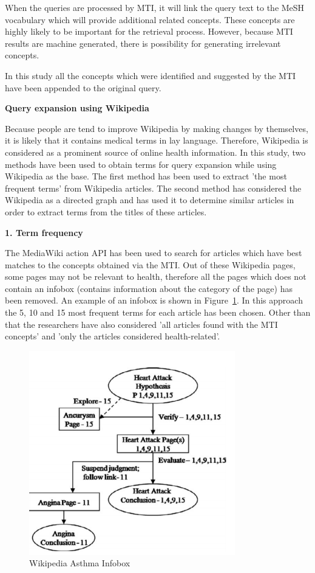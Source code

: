 \documentclass[]{article}
\begin{document}
When the queries are processed by MTI, it will link the query text to the MeSH vocabulary which will provide additional related concepts. These concepts are highly likely to be important for the retrieval process. However, because MTI results are machine generated, there is possibility for generating irrelevant concepts.  
  
In this study all the concepts which were identified and suggested by the MTI have been appended to the original query.  

\textbf{Query expansion using Wikipedia} 

Because people are tend to improve Wikipedia by making changes by themselves, it is likely that it contains medical terms in lay language. Therefore, Wikipedia is considered as a prominent source of online health information. In this study, two methods have been used to obtain terms for query expansion while using Wikipedia as the base. The first method has been used to extract 'the most frequent terms' from Wikipedia articles. The second method has considered the Wikipedia as a directed graph and has used it to determine similar articles in order to extract terms from the titles of these articles.        

\textbf{1. Term frequency} 
 
The MediaWiki action API has been used to search for articles which have best matches to the concepts obtained via the MTI. Out of these Wikipedia pages, some pages may not be relevant to health, therefore all the pages which does not contain an infobox (contains information about the category of the page) has been removed. An example of an infobox is shown in Figure~\ref{fig11}. In this approach the 5, 10 and 15 most frequent terms for each article has been chosen. Other than that the researchers have also considered 'all articles found with the MTI concepts' and 'only the articles considered health-related'.   

\begin{figure}[t!]
	\includegraphics[width=0.8\textwidth]{Capture11.png}
	\caption{Wikipedia Asthma Infobox \label{fig11}}
\end{figure} 
\end{document}
